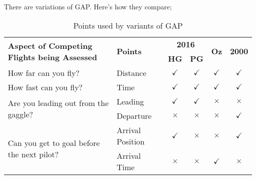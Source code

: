 \documentclass[gap.tex]{subfiles}
\begin{document}
There are variations of GAP. Here's how they compare;
\begin{table}[!ht]
    \begin{tabularx}{\textwidth}{|X|l|c|c|c|c|}
    \hline
         \multirow{2}{*}{\textbf{Aspect of Competing Flights being Assessed}}
         & \multirow{2}{*}{\textbf{Points}}
         & \multicolumn{2}{c|}{\textbf{2016}}
         & \multirow{2}{*}{\textbf{Oz}}
         & \multirow{2}{*}{\textbf{2000}}
         \\
    \cline{3-4}
         &
         & \textbf{HG}
         & \textbf{PG}
         &
         & \\
    \hline
        How far can you fly?
        & Distance
        & $\checkmark$
        & $\checkmark$
        & $\checkmark$
        & $\checkmark$
        \\
    \hline
        How fast can you fly?
        & Time
        & $\checkmark$
        & $\checkmark$
        & $\checkmark$
        & $\checkmark$
        \\
    \hline
        \multirow{2}{*}{Are you leading out from the gaggle?}
        & Leading
        & $\checkmark$
        & $\checkmark$
        & $\times$
        & $\times$
        \\
    \cline{2-6}
        & Departure
        & $\times$
        & $\times$
        & $\times$
        & $\checkmark$
        \\
    \hline
        \multirow{2}{*}{Can you get to goal before the next pilot?}
        & Arrival Position
        & $\checkmark$
        & $\times$
        & $\times$
        & $\checkmark$
        \\
    \cline{2-6}
        & Arrival Time
        & $\times$
        & $\times$
        & $\checkmark$
        & $\times$
        \\
    \hline
    \end{tabularx}
    \caption{Points used by variants of GAP}
    \label{tab:gap-variants}
\end{table}
\end{document}
